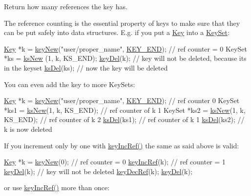Return how many references the key has.  

The reference counting is the essential property of keys to make sure that they can be put safely into data structures. E.\-g. if you put a \hyperlink{classkdb_1_1Key}{Key} into a \hyperlink{classkdb_1_1KeySet}{Key\-Set}\-:


\begin{DoxyCodeInclude}
\hyperlink{classkdb_1_1Key_a5679f5cae63caddd64a60388b9cc77fa}{Key} *k = \hyperlink{group__key_gad23c65b44bf48d773759e1f9a4d43b89}{keyNew}(\textcolor{stringliteral}{"user/proper\_name"}, \hyperlink{group__key_gga91fb3178848bd682000958089abbaf40aa8adb6fcb92dec58fb19410eacfdd403}{KEY\_END}); \textcolor{comment}{// ref counter =
       0}
KeySet *ks = \hyperlink{group__keyset_ga671e1aaee3ae9dc13b4834a4ddbd2c3c}{ksNew} (1, k, KS\_END);
\hyperlink{group__key_ga3df95bbc2494e3e6703ece5639be5bb1}{keyDel}(k); \textcolor{comment}{// key will not be deleted, because its in the keyset}
\hyperlink{group__keyset_ga27e5c16473b02a422238c8d970db7ac8}{ksDel}(ks); \textcolor{comment}{// now the key will be deleted}
\end{DoxyCodeInclude}
 You can even add the key to more Key\-Sets\-:


\begin{DoxyCodeInclude}
\hyperlink{classkdb_1_1Key_a5679f5cae63caddd64a60388b9cc77fa}{Key} *k = \hyperlink{group__key_gad23c65b44bf48d773759e1f9a4d43b89}{keyNew}(\textcolor{stringliteral}{"user/proper\_name"}, \hyperlink{group__key_gga91fb3178848bd682000958089abbaf40aa8adb6fcb92dec58fb19410eacfdd403}{KEY\_END}); \textcolor{comment}{// ref counter 0}
KeySet *ks1 = \hyperlink{group__keyset_ga671e1aaee3ae9dc13b4834a4ddbd2c3c}{ksNew}(1, k, KS\_END); \textcolor{comment}{// ref counter of k 1}
KeySet *ks2 = \hyperlink{group__keyset_ga671e1aaee3ae9dc13b4834a4ddbd2c3c}{ksNew}(1, k, KS\_END); \textcolor{comment}{// ref counter of k 2}
\hyperlink{group__keyset_ga27e5c16473b02a422238c8d970db7ac8}{ksDel}(ks1); \textcolor{comment}{// ref counter of k 1}
\hyperlink{group__keyset_ga27e5c16473b02a422238c8d970db7ac8}{ksDel}(ks2); \textcolor{comment}{// k is now deleted}
\end{DoxyCodeInclude}
 If you increment only by one with \hyperlink{group__key_ga6970a6f254d67af7e39f8e469bb162f1}{key\-Inc\-Ref()} the same as said above is valid\-:


\begin{DoxyCodeInclude}
\hyperlink{classkdb_1_1Key_a5679f5cae63caddd64a60388b9cc77fa}{Key} *k = \hyperlink{group__key_gad23c65b44bf48d773759e1f9a4d43b89}{keyNew}(0); \textcolor{comment}{// ref counter = 0}
\hyperlink{group__key_ga6970a6f254d67af7e39f8e469bb162f1}{keyIncRef}(k); \textcolor{comment}{// ref counter = 1}
\hyperlink{group__key_ga3df95bbc2494e3e6703ece5639be5bb1}{keyDel}(k); \textcolor{comment}{// key will not be deleted}
\hyperlink{group__key_ga2c6433ca22109e4e141946057eccb283}{keyDecRef}(k);
\hyperlink{group__key_ga3df95bbc2494e3e6703ece5639be5bb1}{keyDel}(k);
\end{DoxyCodeInclude}
 or use \hyperlink{group__key_ga6970a6f254d67af7e39f8e469bb162f1}{key\-Inc\-Ref()} more than once\-:



